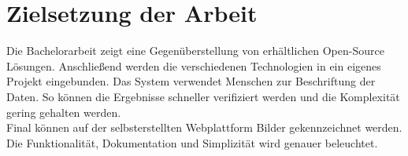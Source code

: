 \label{sec:zielsetzung}
\section{Zielsetzung der Arbeit}
Die Bachelorarbeit zeigt eine Gegenüberstellung von erhältlichen Open-Source Lösungen. Anschließend werden die verschiedenen Technologien in ein eigenes Projekt eingebunden. Das System verwendet Menschen zur Beschriftung der Daten. So können die Ergebnisse schneller verifiziert werden und die Komplexität gering gehalten werden.\\
Final können auf der selbsterstellten Webplattform Bilder gekennzeichnet werden. Die Funktionalität, Dokumentation und Simplizität wird genauer beleuchtet.